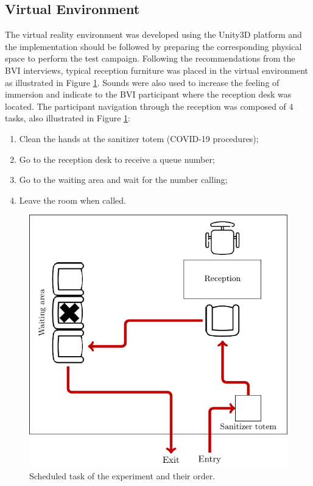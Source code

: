     \subsection*{Virtual Environment}
    The virtual reality environment was developed using the Unity3D platform and the implementation should be followed by preparing the corresponding physical space to perform the test campaign. Following the recommendations from the BVI interviews, typical reception furniture was placed in the virtual environment as illustrated in Figure \ref{fig:task_diagram}. Sounds were also used to increase the feeling of immersion and indicate to the BVI participant where the reception desk was located. The participant navigation through the reception was composed of 4 tasks, also illustrated in Figure \ref{fig:task_diagram}:

    \begin{enumerate}
        \item Clean the hands at the sanitizer totem (COVID-19 procedures);
        \item Go to the reception desk to receive a queue number;
        \item Go to the waiting area and wait for the number calling;
        \item Leave the room when called.
    \end{enumerate}

    \begin{figure}[!htb]
        \includegraphics[width = \linewidth]{2 - Metodologia/caminho.pdf}
        \caption{Scheduled task of the experiment and their order.}
        \label{fig:task_diagram}
    \end{figure}

